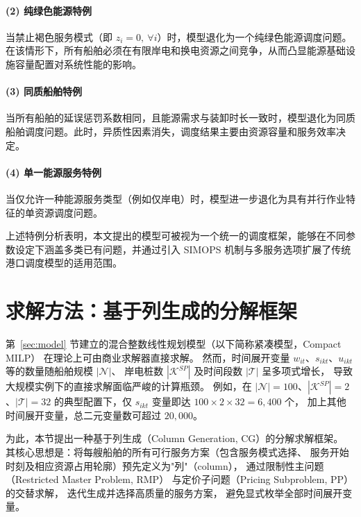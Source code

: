 \documentclass[UTF8, a4paper, 12pt]{ctexart}
\begin{document}
\paragraph{(2) 纯绿色能源特例}
当禁止褐色服务模式（即 $z_i=0,\ \forall i$）时，模型退化为一个纯绿色能源调度问题。在该情形下，所有船舶必须在有限岸电和换电资源之间竞争，从而凸显能源基础设施容量配置对系统性能的影响。

\paragraph{(3) 同质船舶特例}
当所有船舶的延误惩罚系数相同，且能源需求与装卸时长一致时，模型退化为同质船舶调度问题。此时，异质性因素消失，调度结果主要由资源容量和服务效率决定。

\paragraph{(4) 单一能源服务特例}
当仅允许一种能源服务类型（例如仅岸电）时，模型进一步退化为具有并行作业特征的单资源调度问题。

上述特例分析表明，本文提出的模型可被视为一个统一的调度框架，能够在不同参数设定下涵盖多类已有问题，并通过引入 SIMOPS 机制与多服务选项扩展了传统港口调度模型的适用范围。



\section{求解方法：基于列生成的分解框架}
\label{sec:cg}

第~\ref{sec:model} 节建立的混合整数线性规划模型（以下简称紧凑模型，Compact MILP）
在理论上可由商业求解器直接求解。
然而，时间展开变量 $w_{it}$、$s_{ikt}$、$u_{ikt}$ 等的数量随船舶规模 $|\mathcal{N}|$、
岸电桩数 $|\mathcal{K}^{SP}|$ 及时间段数 $|\mathcal{T}|$ 呈多项式增长，
导致大规模实例下的直接求解面临严峻的计算瓶颈。
例如，在 $|\mathcal{N}| = 100$、$|\mathcal{K}^{SP}| = 2$、$|\mathcal{T}| = 32$
的典型配置下，仅 $s_{ikt}$ 变量即达 $100 \times 2 \times 32 = 6{,}400$ 个，
加上其他时间展开变量，总二元变量数可超过 $20{,}000$。

为此，本节提出一种基于列生成（Column Generation, CG）的分解求解框架。
其核心思想是：将每艘船舶的所有可行服务方案（包含服务模式选择、
服务开始时刻及相应资源占用轮廓）预先定义为"列"（column），
通过限制性主问题（Restricted Master Problem, RMP）
与定价子问题（Pricing Subproblem, PP）的交替求解，
迭代生成并选择高质量的服务方案，
避免显式枚举全部时间展开变量。
\end{document}
